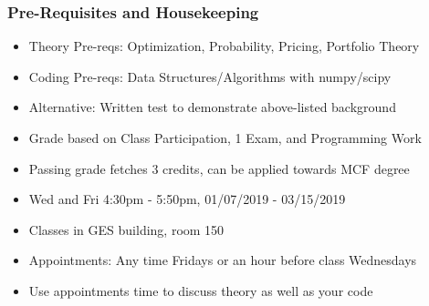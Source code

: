 \documentclass{beamer}
\begin{document}
\begin{frame}
\frametitle{Pre-Requisites and Housekeeping}
\begin{itemize}
\item Theory Pre-reqs: Optimization, Probability, Pricing, Portfolio Theory
\item Coding Pre-reqs: Data Structures/Algorithms with numpy/scipy
\item Alternative: Written test to demonstrate above-listed background
\item Grade based on Class Participation, 1 Exam, and Programming Work
\item Passing grade fetches 3 credits, can be applied towards MCF degree
\item Wed and Fri 4:30pm - 5:50pm, 01/07/2019 - 03/15/2019
\item Classes in GES building, room 150
\item Appointments: Any time Fridays or an hour before class Wednesdays
\item Use appointments time to discuss theory as well as your code
\end{itemize}
\end{frame}
\end{document}
